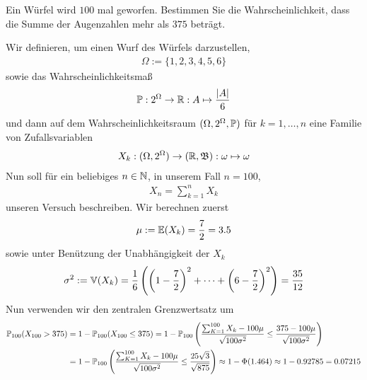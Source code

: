 \begin{exercise}

Ein Würfel wird $100$ mal geworfen. Bestimmen Sie die Wahrscheinlichkeit, dass die Summe der Augenzahlen mehr als $375$ beträgt.

\end{exercise}

\begin{solution}

Wir definieren, um einen Wurf des Würfels darzustellen,
\begin{align*}
    \Omega := \{1,2,3,4,5,6\}
\end{align*}
sowie das Wahrscheinlichkeitsmaß
\begin{align*}
    \P:2^{\Omega} \to \R: A \mapsto  \frac{\vert A \vert}{6}
\end{align*}
und dann auf dem Wahrscheinlichkeitsraum $(\Omega,2^{\Omega},\P)$ für $k= 1,\dots,n$ eine Familie von Zufallsvariablen
\begin{align*}
    X_k:(\Omega,2^{\Omega}) \to (\R,\B): \omega \mapsto \omega
\end{align*}
Nun soll für ein beliebiges $n \in \N$, in unserem Fall $n=100$,
\begin{align*}
    X_n = \sum_{k=1}^{n}X_k
\end{align*}
unseren Versuch beschreiben. Wir berechnen zuerst
\begin{align*}
    \mu := \E(X_k) = \frac{7}{2} = 3.5
\end{align*}
sowie unter Benützung der Unabhängigkeit der $X_k$
\begin{align*}
    \sigma^2 := \V(X_k) = \frac{1}{6} \pbraces{\pbraces{1-\frac{7}{2}}^2+\cdots+\pbraces{6-\frac{7}{2}}^2} = \frac{35}{12}
\end{align*}
Nun verwenden wir den zentralen Grenzwertsatz um
\begin{align*}
    \P_{100}(X_{100} > 375) &= 1 - \P_{100}(X_{100} \leq 375) = 1 - \P_{100}\pbraces{\frac{\sum_{K=1}^{100}X_k - 100\mu}{\sqrt{100\sigma^2}} \leq \frac{375 - 100\mu}{\sqrt{100\sigma^2}}} \\
    &= 1 - \P_{100}\pbraces{\frac{\sum_{K=1}^{100}X_k - 100\mu}{\sqrt{100\sigma^2}} \leq \frac{25\sqrt{3}}{\sqrt{875}}} \approx 1 - \Phi(1.464) \approx 1 - 0.92785 = 0.07215
\end{align*}
\end{solution}
